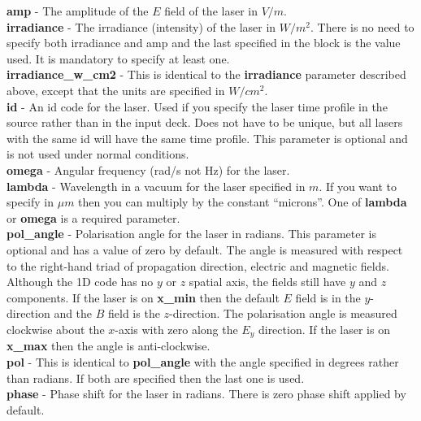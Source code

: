 \documentclass[12pt,a4paper]{article}
\newcommand{\emphtext}{\color{warwickdark} \fontfamily{phv}\selectfont\large\bf}
\newcommand{\inlineemph}[1]{{\color{warwicklight} \bf{#1}}}
\newcommand{\EPOCH}{{\color{warwickdark}\fontfamily{phv}\selectfont{EPOCH}}}
\begin{document}
{\emphtext amp} - The amplitude of the $E$ field of the laser in $V/m$.\\

{\emphtext irradiance} - The irradiance (intensity) of the laser in $W/m^2$.
There is no need to specify both irradiance and amp and the last specified
in the block is the value used. It is mandatory to specify at least one.\\

{\emphtext irradiance\_w\_cm2} - This is identical to the 
\inlineemph{irradiance} parameter described above, except that the units
are specified in $W/cm^2$.\\

{\emphtext id} - An id code for the laser. Used if you specify the laser time
profile in the {\EPOCH} source rather than in the input deck. Does not have to
be unique, but all lasers with the same id will have the same time profile.
This parameter is optional and is not used under normal conditions.\\

{\emphtext omega} - Angular frequency (rad/s not Hz) for the laser.\\

{\emphtext lambda} - Wavelength in a vacuum for the laser specified in $m$.
If you want to specify in $\mu m$ then you can multiply by the constant
``microns''. One of \inlineemph{lambda} or \inlineemph{omega} is a
required parameter.\\

{\emphtext pol\_angle} - Polarisation angle for the laser in radians.
This parameter is optional and has a value of zero by default.
The angle is measured with respect to the right-hand triad of propagation
direction, electric and magnetic fields. Although the 1D code has no $y$
or $z$ spatial axis, the fields still have $y$ and $z$ components.
If the laser is on \inlineemph{x\_min} then the default $E$ field is in
the $y$-direction and the $B$ field is the $z$-direction. The polarisation
angle is measured clockwise about the $x$-axis with zero along the $E_y$
direction. If the laser is on \inlineemph{x\_max} then the angle is
anti-clockwise.\\

{\emphtext pol} - This is identical to \inlineemph{pol\_angle} with the angle
specified in degrees rather than radians. If both are specified then the
last one is used.\\

{\emphtext phase} - Phase shift for the laser in radians. 
There is zero phase shift applied by default.\\
\end{document}
